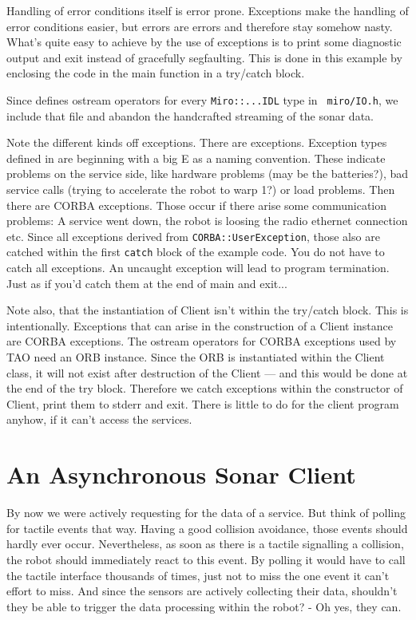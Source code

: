 Handling of error conditions itself is error prone. Exceptions make
the handling of error conditions easier, but errors are errors and
therefore stay somehow nasty. What's quite easy to achieve by the use
of exceptions is to print some diagnostic output and exit instead of
gracefully segfaulting. This is done in this example by enclosing the
code in the main function in a try/catch block.

Since \miro defines ostream operators for every \lstinline!Miro::...IDL!
type in \lstinline! miro/IO.h!, we include that file and abandon the
handcrafted streaming of the sonar data.

Note the different kinds off exceptions. There are \miro
exceptions. Exception types defined in \miro are beginning with a
big E as a naming convention. These indicate problems on the
service side, like hardware problems (may be the batteries?), bad
service calls (trying to accelerate the robot to warp 1?) or load
problems. Then there are CORBA exceptions. Those occur if there
arise some communication problems: A service went down, the robot
is loosing the radio ethernet connection etc. Since all \miro
exceptions derived from \lstinline!CORBA::UserException!, those
also are catched within the first \lstinline!catch! block of the
example code. You do not have to catch all exceptions. An uncaught
exception will lead to program termination. Just as if you'd catch
them at the end of main and exit...

Note also, that the instantiation of Client isn't within the try/catch
block. This is intentionally. Exceptions that can arise in the
construction of a Client instance are CORBA exceptions. The ostream
operators for CORBA exceptions used by TAO need an ORB
instance. Since the ORB is instantiated within the Client class, it
will not exist after destruction of the Client --- and this would be
done at the end of the try block. Therefore we catch exceptions within
the constructor of Client, print them to stderr and exit. There is
little to do for the client program anyhow, if it can't access the
services.


\label{lst:SonarPoll3}

\section{An Asynchronous Sonar Client}
\label{sec:notify}

By now we were actively requesting for the data of a service. But
think of polling for tactile events that way. Having a good
collision avoidance, those events should hardly ever occur.
Nevertheless, as soon as there is a tactile signalling a
collision, the robot should immediately react to this event. By
polling it would have to call the tactile interface thousands of
times, just not to miss the one event it can't effort to miss. And
since the sensors are actively collecting their data, shouldn't
they be able to trigger the data processing within the robot? - Oh
yes, they can.

